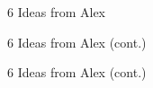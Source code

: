 \documentclass[5pt]{article} %
\begin{document}
\begin{figure}[h!]
\centering
{}
\caption{6 Ideas from Alex}
\end{figure}

\begin{figure}[h!]
\centering
{}
\caption{6 Ideas from Alex (cont.)}
\end{figure}

\begin{figure}[h!]
\centering
{}
\caption{6 Ideas from Alex (cont.)}
\end{figure}
\end{document}
